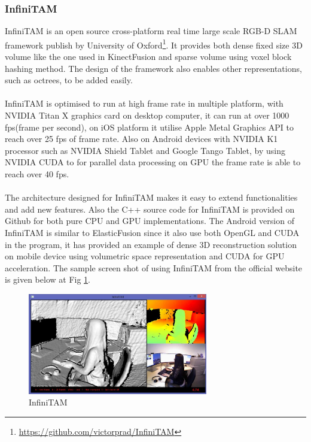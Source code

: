 \documentclass[12pt,twoside]{article}
\begin{document}
\subsubsection{InfiniTAM}
InfiniTAM\citep{InfiniTAM_ISMAR_2015} is an open source cross-platform real time large scale RGB-D SLAM framework publish by University of Oxford\footnote{\url{https://github.com/victorprad/InfiniTAM}}. It provides both dense fixed size 3D volume like the one used in KinectFusion\citep{newcombe2011kinectfusion} and sparse volume using voxel block hashing method\citep{niessner2013real}. The design of the framework also enables other representations, such as octrees, to be added easily.\\
\\
InfiniTAM is optimised to run at high frame rate in multiple platform, with NVIDIA Titan X graphics card on desktop computer, it can run at over 1000 fps(frame per second), on iOS platform it utilise Apple Metal Graphics API to reach over 25 fps of frame rate. Also on Android devices with NVIDIA K1 processor such as NVIDIA Shield Tablet and Google Tango Tablet, by using NVIDIA CUDA to for parallel data processing on GPU the frame rate is able to reach over 40 fps.\\
\\
The architecture designed for InfiniTAM makes it easy to extend functionalities and add new features. Also the C++ source code for InfiniTAM is provided on Github for both pure CPU and GPU implementations. The Android version of InfiniTAM is similar to ElasticFusion since it also use both OpenGL and CUDA in the program, it has provided an example of dense 3D reconstruction solution on mobile device using volumetric space representation and CUDA for GPU acceleration. The sample screen shot of using InfiniTAM from the official website is given below at Fig \ref{fig: InfiniTAM}.\\

\begin{figure}[h]
    \centering
    \includegraphics[width=0.7\textwidth]{figures/InfiniTAM}
    \caption{InfiniTAM}
    \label{fig: InfiniTAM}
\end{figure}
\end{document}
